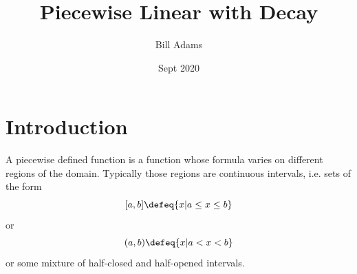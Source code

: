 \documentclass[10pt]{article}
\title{Piecewise Linear with Decay}
\author{Bill Adams}
\date{Sept 2020}
\begin{document}
\maketitle

\tableofcontents


\section{Introduction}
A piecewise defined function is a function whose formula varies on different
regions of the domain. Typically those regions are continuous intervals, i.e.
sets of the form
$$[a,b] \defeq \{x | a \leq x \leq b\}$$
or
$$(a,b) \defeq \{x | a < x < b\}$$
or some mixture of half-closed and half-opened intervals.
\end{document}
